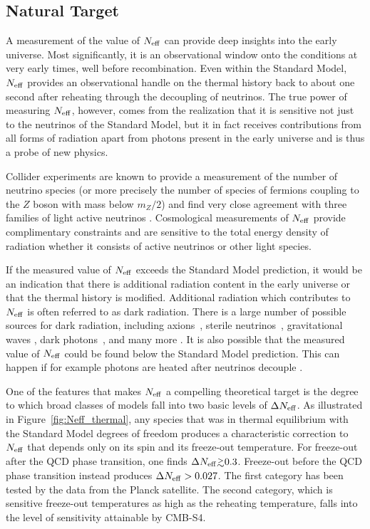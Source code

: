 \subsection{Natural Target}

A measurement of the value of $N_{\rm eff}$ can provide deep insights into the early universe.  Most significantly, it is an observational window onto the conditions at very early times, well before recombination.  Even within the Standard Model, $N_{\rm eff}$ provides an observational handle on the thermal history back to about one second after reheating through the decoupling of neutrinos.  The true power of measuring $N_{\rm eff}$, however, comes from the realization that it is sensitive not just to the neutrinos of the Standard Model, but it in fact receives contributions from all forms of radiation apart from photons present in the early universe and is thus a probe of new physics.

Collider experiments are known to provide a measurement of the number of neutrino species (or more precisely the number of species of fermions coupling to the $Z$ boson with mass below $m_Z/2$) and find very close agreement with three families of light active neutrinos \cite{ALEPH:2005ab}.  Cosmological measurements of $N_{\rm eff}$ provide complimentary constraints and are sensitive to the total energy density of radiation whether it consists of active neutrinos or other light species.

If the measured value of $N_{\rm eff}$ exceeds the Standard Model prediction, it would be an indication that there is additional radiation content in the early universe or that the thermal history is modified.  Additional radiation which contributes to $N_{\rm eff}$ is often referred to as dark radiation.  There is a large number of possible sources for dark radiation, including axions~\cite{Brust:2013xpv,Salvio:2013iaa,Kawasaki:2015ofa,Baumann:2016wac}, sterile neutrinos~\cite{Abazajian:2001nj,Strumia:2006db,Boyarsky:2009ix}, gravitational waves \cite{Boyle:2007zx,Stewart:2007fu,Meerburg:2015zua}, dark photons~\cite{Ackerman:2008gi,Kaplan:2011yj,CyrRacine:2012fz}, and many more \cite{Cadamuro:2010cz,Weinberg:2013kea}.  It is also possible that the measured value of $N_{\rm eff}$ could be found below the Standard Model prediction.  This can happen if for example photons are heated after neutrinos decouple \cite{Steigman:2013yua,Boehm:2013jpa}.

One of the features that makes $N_{\rm eff}$ a compelling theoretical target is the degree to which broad classes of models fall into two basic levels of $\Delta N_{\rm eff}$.  As illustrated in Figure~\ref{fig:Neff_thermal}, any species that was in thermal equilibrium with the Standard Model degrees of freedom produces a characteristic correction to $N_{\rm eff}$ that depends only on its spin and its freeze-out temperature.  For freeze-out after the QCD phase transition, one finds $\Delta \Neff \gtrsim 0.3$.  Freeze-out before the QCD phase transition instead produces $\Delta N_{\rm eff} > 0.027$.  The first category has been tested by the data from the Planck satellite.  The second category, which is sensitive freeze-out temperatures as high as the reheating temperature, falls into the level of sensitivity attainable by CMB-S4.

